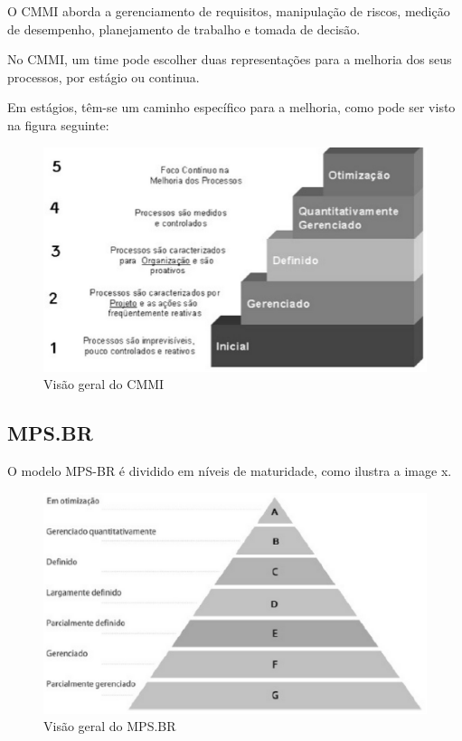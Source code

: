 O CMMI aborda a gerenciamento de requisitos, manipulação de riscos, medição de desempenho,
planejamento de trabalho e tomada de decisão.

No CMMI, um time pode escolher duas representações para a melhoria dos seus processos,
por estágio ou continua.

Em estágios, têm-se um caminho específico para a melhoria, como pode ser visto na figura seguinte:

\begin{figure}[H]
    \centering
  \includegraphics[keepaspectratio=true,scale=0.3]{figuras/cmmi.eps}
    \caption{Visão geral do CMMI}
    \label{fig:cmmi}
\end{figure}

\subsection{MPS.BR}

O modelo MPS-BR é dividido em níveis de maturidade, como ilustra a image x.

\begin{figure}[H]
    \centering
  \includegraphics[keepaspectratio=true,scale=0.3]{figuras/mpsbr.eps}
    \caption{Visão geral do MPS.BR}
    \label{fig:mps}
\end{figure}

